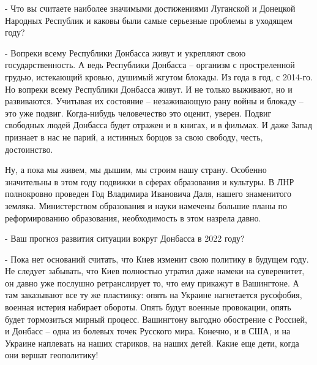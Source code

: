 - Что вы считаете наиболее значимыми достижениями Луганской и Донецкой Народных
Республик и каковы были самые серьезные проблемы в уходящем году?

- Вопреки всему Республики Донбасса живут и укрепляют свою государственность. А
ведь Республики Донбасса – организм с простреленной грудью, истекающий кровью,
душимый жгутом блокады. Из года в год, с 2014-го. Но вопреки всему Республики
Донбасса живут. И не только выживают, но и развиваются. Учитывая их состояние –
незаживающую рану войны и блокаду – это уже подвиг. Когда-нибудь человечество
это оценит, уверен. Подвиг свободных людей Донбасса будет отражен и в книгах, и
в фильмах. И даже Запад признает в нас не парий, а истинных борцов за свою
свободу, честь, достоинство.

Ну, а пока мы живем, мы дышим, мы строим нашу страну. Особенно значительны в
этом году подвижки в сферах образования и культуры. В ЛНР полнокровно проведен
Год Владимира Ивановича Даля, нашего знаменитого земляка. Министерством
образования и науки намечены большие планы по реформированию образования,
необходимость в этом назрела давно.

- Ваш прогноз развития ситуации вокруг Донбасса в 2022 году?

- Пока нет оснований считать, что Киев изменит свою политику в будущем году. Не
следует забывать, что Киев полностью утратил даже намеки на суверенитет, он
давно уже послушно ретранслирует то, что ему прикажут в Вашингтоне. А там
заказывают все ту же пластинку: опять на Украине нагнетается русофобия, военная
истерия набирает обороты. Опять будут военные провокации, опять будет
тормозиться мирный процесс. Вашингтону выгодно обострение с Россией, и Донбасс
– одна из болевых точек Русского мира. Конечно, и в США, и на Украине наплевать
на наших стариков, на наших детей. Какие еще дети, когда они вершат
геополитику!
